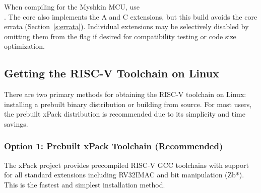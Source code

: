\documentclass[11pt,pdftex,portrait,letterpaper]{article}
\begin{document}
When compiling for the Myshkin MCU, use \\ . The core also implements the A and C extensions, but this build avoids the core errata (Section~\ref{s:errata}). Individual extensions may be selectively disabled by omitting them from the  flag if desired for compatibility testing or code size optimization.

\subsection{Getting the RISC-V Toolchain on Linux} \label{ss:linuxinstall}
There are two primary methods for obtaining the RISC-V toolchain on Linux: installing a prebuilt binary distribution or building from source. For most users, the prebuilt xPack distribution is recommended due to its simplicity and time savings.

\subsubsection{Option 1: Prebuilt xPack Toolchain (Recommended)}

The xPack project provides precompiled RISC-V GCC toolchains with support for all standard extensions including RV32IMAC and bit manipulation (Zb*). This is the fastest and simplest installation method.
\end{document}
